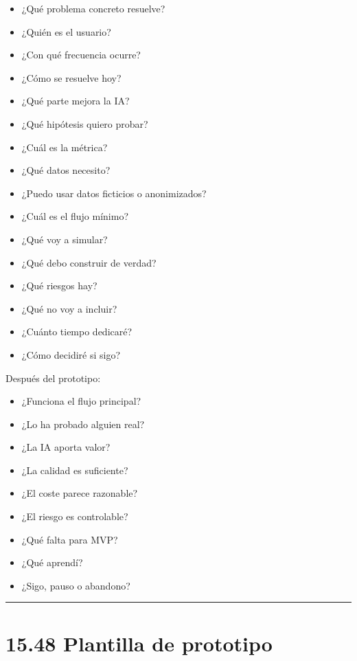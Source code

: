 \begin{itemize}
\tightlist
\item
  ¿Qué problema concreto resuelve?
\item
  ¿Quién es el usuario?
\item
  ¿Con qué frecuencia ocurre?
\item
  ¿Cómo se resuelve hoy?
\item
  ¿Qué parte mejora la IA?
\item
  ¿Qué hipótesis quiero probar?
\item
  ¿Cuál es la métrica?
\item
  ¿Qué datos necesito?
\item
  ¿Puedo usar datos ficticios o anonimizados?
\item
  ¿Cuál es el flujo mínimo?
\item
  ¿Qué voy a simular?
\item
  ¿Qué debo construir de verdad?
\item
  ¿Qué riesgos hay?
\item
  ¿Qué no voy a incluir?
\item
  ¿Cuánto tiempo dedicaré?
\item
  ¿Cómo decidiré si sigo?
\end{itemize}

Después del prototipo:

\begin{itemize}
\tightlist
\item
  ¿Funciona el flujo principal?
\item
  ¿Lo ha probado alguien real?
\item
  ¿La IA aporta valor?
\item
  ¿La calidad es suficiente?
\item
  ¿El coste parece razonable?
\item
  ¿El riesgo es controlable?
\item
  ¿Qué falta para MVP?
\item
  ¿Qué aprendí?
\item
  ¿Sigo, pauso o abandono?
\end{itemize}

\begin{center}\rule{0.5\linewidth}{0.5pt}\end{center}

\section{15.48 Plantilla de prototipo}\label{plantilla-de-prototipo}

